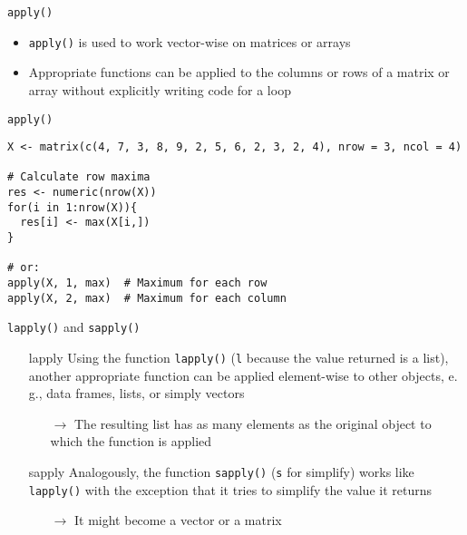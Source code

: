 \documentclass[aspectratio=169]{beamer}
\begin{document}
\begin{frame}{\texttt{apply()}}
  \begin{itemize}
    \item \texttt{apply()} is used to work vector-wise on matrices or
      arrays
    \item Appropriate functions can be applied to the columns or rows
      of a matrix or array without explicitly writing code for a loop
  \end{itemize}
\end{frame}


\begin{frame}[fragile]{\texttt{apply()}}
\begin{lstlisting}
X <- matrix(c(4, 7, 3, 8, 9, 2, 5, 6, 2, 3, 2, 4), nrow = 3, ncol = 4)

# Calculate row maxima
res <- numeric(nrow(X))
for(i in 1:nrow(X)){
  res[i] <- max(X[i,])
}

# or:
apply(X, 1, max)  # Maximum for each row
apply(X, 2, max)  # Maximum for each column
\end{lstlisting}
\end{frame}

\begin{frame}{\texttt{lapply()} and \texttt{sapply()}}
  \begin{itemize}
    \item[lapply] Using the function \texttt{lapply()} (\texttt{l} because the
      value returned is a list), another appropriate function can be
      applied element-wise to other objects, e.\,g., data frames,
      lists, or simply vectors
      \begin{itemize}
        \item[$\to$] The resulting list has as many elements as the original
          object to which the function is applied
      \end{itemize}
      \vspace{.2cm}
    \item[sapply] Analogously, the function \texttt{sapply()} (\texttt{s} for
      simplify) works like \texttt{lapply()} with the exception that it
      tries to simplify the value it returns
      \begin{itemize}
        \item[$\to$] It might become a vector or a matrix
      \end{itemize}
  \end{itemize}
  \vfill
\end{frame}
\end{document}
